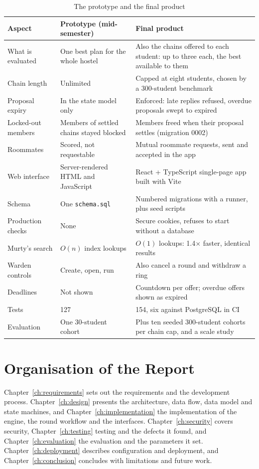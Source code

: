 \begin{table}[H]
\centering
\small
\begin{tabularx}{\textwidth}{>{\raggedright\arraybackslash}p{} L L}
\toprule
\textbf{Aspect} & \textbf{Prototype (mid-semester)} & \textbf{Final product} \\
\midrule
What is evaluated & One best plan for the whole hostel & Also the chains offered to each student: up to three each, the best available to them \\
Chain length & Unlimited & Capped at eight students, chosen by a 300-student benchmark \\
Proposal expiry & In the state model only & Enforced: late replies refused, overdue proposals swept to expired \\
Locked-out members & Members of settled chains stayed blocked & Members freed when their proposal settles (migration 0002) \\
Roommates & Scored, not requestable & Mutual roommate requests, sent and accepted in the app \\
Web interface & Server-rendered HTML and JavaScript & React + TypeScript single-page app built with Vite \\
Schema & One \texttt{schema.sql} & Numbered migrations with a runner, plus seed scripts \\
Production checks & None & Secure cookies, refuses to start without a database \\
Murty's search & $O(n)$ index lookups & $O(1)$ lookups: 1.4$\times$ faster, identical results \\
Warden controls & Create, open, run & Also cancel a round and withdraw a ring \\
Deadlines & Not shown & Countdown per offer; overdue offers shown as expired \\
Tests & 127 & 154, six against PostgreSQL in CI \\
Evaluation & One 30-student cohort & Plus ten seeded 300-student cohorts per chain cap, and a scale study \\
\bottomrule
\end{tabularx}
\caption{The prototype and the final product}
\label{tab:prototype-vs-final}
\end{table}

\section{Organisation of the Report}

Chapter~\ref{ch:requirements} sets out the requirements and the
development process. Chapter~\ref{ch:design} presents the architecture,
data flow, data model and state machines, and
Chapter~\ref{ch:implementation} the implementation of the engine, the
round workflow and the interfaces. Chapter~\ref{ch:security} covers
security, Chapter~\ref{ch:testing} testing and the defects it found, and
Chapter~\ref{ch:evaluation} the evaluation and the parameters it set.
Chapter~\ref{ch:deployment} describes configuration and deployment, and
Chapter~\ref{ch:conclusion} concludes with limitations and future work.
